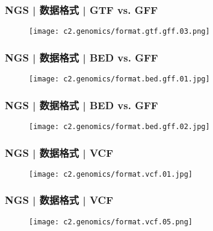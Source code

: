 \begin{frame}
  \frametitle{NGS | 数据格式 | GTF vs. GFF}
  \begin{figure}
    \centering
    \texttt{[image: c2.genomics/format.gtf.gff.03.png]}
  \end{figure}
\end{frame}

\begin{frame}
  \frametitle{NGS | 数据格式 | \alert{BED vs. GFF}}
  \begin{figure}
    \centering
    \texttt{[image: c2.genomics/format.bed.gff.01.jpg]}
  \end{figure}
\end{frame}

\begin{frame}
  \frametitle{NGS | 数据格式 | BED vs. GFF}
  \begin{figure}
    \centering
    \texttt{[image: c2.genomics/format.bed.gff.02.jpg]}
  \end{figure}
\end{frame}

\begin{frame}
  \frametitle{NGS | 数据格式 | VCF}
  \begin{figure}
    \centering
    \texttt{[image: c2.genomics/format.vcf.01.jpg]}
  \end{figure}
\end{frame}

\begin{frame}
  \frametitle{NGS | 数据格式 | \alert{VCF}}
  \begin{figure}
    \centering
    \texttt{[image: c2.genomics/format.vcf.05.png]}
  \end{figure}
\end{frame}

